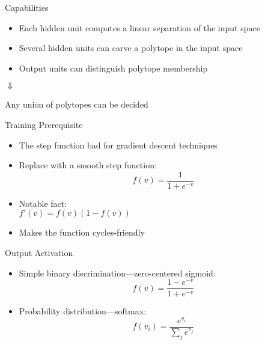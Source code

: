 \documentclass[size=14pt,
  style=tycja,
  paper=screen,
  ]{powerdot}
\begin{document}
\begin{slide}{Capabilities}
  \begin{itemize}
  \item Each hidden unit computes a linear separation of the input space
  \item Several hidden units can carve a polytope in the input space
  \item Output units can distinguish polytope membership
  \end{itemize}

  \center $\mathbf \Downarrow$

  \phantom{a}

  Any union of polytopes can be decided
\end{slide}

\begin{slide}{Training Prerequisite}
  \begin{itemize}
  \item The step function bad for gradient descent techniques
  \item Replace with a smooth step function:
  \begin{equation}
    f(v) = \displaystyle\frac{1}{1 + e^{-v}}
  \end{equation}
  \item Notable fact:\\
    $f'(v) = f(v)(1 - f(v))$
  \item Makes the function cycles-friendly
  \end{itemize}
\end{slide}

\begin{slide}{Output Activation}
  \begin{itemize}
  \item Simple binary discrimination---zero-centered sigmoid:
  \begin{equation}
    f(v) = \displaystyle\frac{1 - e^{-v}}{1 + e^{-v}}
  \end{equation}
  \item Probability distribution---softmax:
  \begin{equation}
    f(v_i) = \displaystyle\frac{e^{v_i}}{\displaystyle\sum_{j} e^{v_j}}
  \end{equation}
  \end{itemize}
\end{slide}
\end{document}
